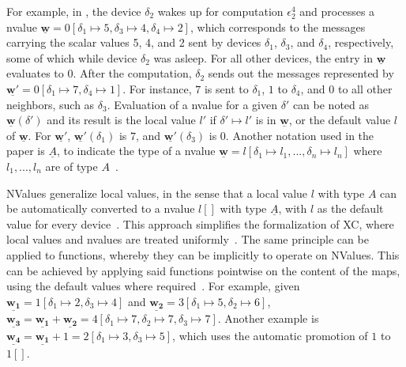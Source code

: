 For example, in , the device $\delta_2$ wakes up for computation $\epsilon_2^4$ and processes a nvalue $\underline{\mathbf{w}} = 0[\delta_1 \mapsto 5, \delta_3 \mapsto 4, \delta_4 \mapsto 2]$, which corresponds to the messages carrying the scalar values 5, 4, and 2 sent by devices $\delta_1$, $\delta_3$, and $\delta_4$, respectively, some of which while device $\delta_2$ was asleep.
%
For all other devices, the entry in $\underline{\mathbf{w}}$ evaluates to $0$.
%
After the computation, $\delta_2$ sends out the messages represented by $\underline{\mathbf{w'}} = 0[\delta_1 \mapsto 7, \delta_4 \mapsto 1]$.
%
For instance, $7$ is sent to $\delta_1$, $1$ to $\delta_4$, and $0$ to all other neighbors, such as $\delta_3$.
%
Evaluation of a nvalue for a given $\delta'$ can be noted as $\underline{\mathbf{w}}(\delta')$ and its result is the local value $l'$ if $\delta' \mapsto l'$ is in $\underline{\mathbf{w}}$, or the default value $l$ of $\underline{\mathbf{w}}$.
%
For $\underline{\mathbf{w'}}$, $\underline{\mathbf{w'}}(\delta_1)$ is $7$, and $\underline{\mathbf{w'}}(\delta_3)$ is 0.
%
Another notation used in the paper is $\underline{A}$, to indicate the type of a nvalue $\underline{\mathbf{w}} = l[\delta_1 \mapsto l_1, ..., \delta_n \mapsto l_n]$ where $l_1, ..., l_n$ are of type $A$~\cite{xc}.

NValues generalize local values, in the sense that a local value $l$ with type $A$ can be automatically converted to a nvalue $l[]$ with type $\underline{A}$, with $l$ as the default value for every device~\cite{xc}.
%
This approach simplifies the formalization of \ac{XC}, where local values and nvalues are treated uniformly~\cite{xc}.
%
The same principle can be applied to functions,  whereby they can be implicitly  to operate on NValues.
%
This can be achieved by applying said functions pointwise on the content of the maps, using the default values where required~\cite{xc}.
%
For example, given $\underline{\mathbf{w_1}} = 1[\delta_1 \mapsto 2, \delta_3 \mapsto 4]$ and $\underline{\mathbf{w_2}} = 3[\delta_1 \mapsto 5, \delta_2 \mapsto 6]$, $\underline{\mathbf{w_3}} = \underline{\mathbf{w_1}} + \underline{\mathbf{w_2}} = 4[\delta_1 \mapsto 7, \delta_2 \mapsto 7, \delta_3 \mapsto 7]$.
%
Another example is $\underline{\mathbf{w_4}} = \underline{\mathbf{w_1}} + 1 = 2[\delta_1 \mapsto 3, \delta_3 \mapsto 5]$, which uses the automatic promotion of $1$ to $1[]$.

